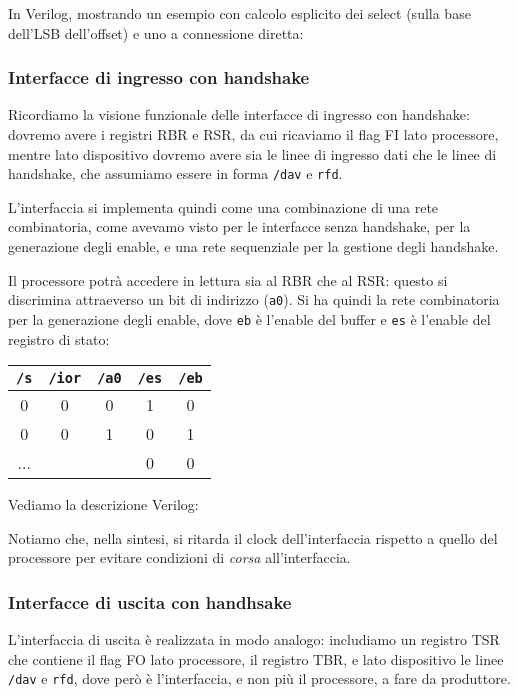 \documentclass[a4paper,11pt]{article}
\begin{document}
In Verilog, mostrando un esempio con calcolo esplicito dei select (sulla base dell'LSB dell'offset) e uno a connessione diretta: 


\subsubsection{Interfacce di ingresso con handshake}
Ricordiamo la visione funzionale delle interfacce di ingresso con handshake: dovremo avere i registri RBR e RSR, da cui ricaviamo il flag FI lato processore, mentre lato dispositivo dovremo avere sia le linee di ingresso dati che le linee di handshake, che assumiamo essere in forma \lstinline|/dav| e \lstinline|rfd|.

L'interfaccia si implementa quindi come una combinazione di una rete combinatoria, come avevamo visto per le interfacce senza handshake, per la generazione degli enable, e una rete sequenziale per la gestione degli handshake.

Il processore potrà accedere in lettura sia al RBR che al RSR: questo si discrimina attraeverso un bit di indirizzo (\lstinline|a0|).
Si ha quindi la rete combinatoria per la generazione degli enable, dove \lstinline|eb| è l'enable del buffer e \lstinline|es| è l'enable del registro di stato:
\begin{table}[h!]
	\center 
	\begin{tabular} { c  c  c | c  c }
		\lstinline|/s| & \lstinline|/ior| & \lstinline|/a0| & \lstinline|/es| & \lstinline|/eb| \\ 
		\hline 
		0 & 0 & 0 & 1 & 0 \\ 
		0 & 0 & 1 & 0 & 1 \\ 
		... & & & 0 & 0 
	\end{tabular}
\end{table}

Vediamo la descrizione Verilog:


Notiamo che, nella sintesi, si ritarda il clock dell'interfaccia rispetto a quello del processore per evitare condizioni di \textit{corsa} all'interfaccia.

\subsubsection{Interfacce di uscita con handhsake}
L'interfaccia di uscita è realizzata in modo analogo: includiamo un registro TSR che contiene il flag FO lato processore, il registro TBR, e lato dispositivo le linee \lstinline|/dav| e \lstinline|rfd|, dove però è l'interfaccia, e non più il processore, a fare da produttore.
\end{document}
